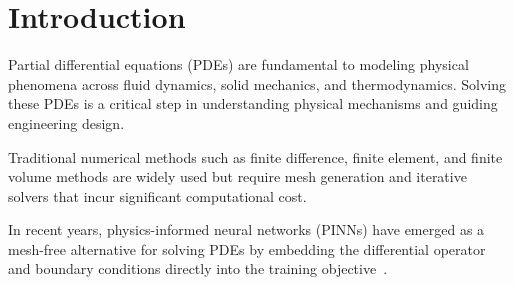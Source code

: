 \section{Introduction}

Partial differential equations (PDEs)
are fundamental to modeling physical phenomena across fluid dynamics,
solid mechanics, and thermodynamics.
Solving these PDEs is a critical step in understanding physical mechanisms and
guiding engineering design.

Traditional numerical methods such as finite difference, finite element,
and finite volume methods are widely used but require mesh generation and
iterative solvers that incur significant computational cost.

In recent years, physics-informed neural networks (PINNs)
have emerged as a mesh-free alternative for solving PDEs by embedding the
differential operator and boundary conditions directly into the
training objective~\cite{raissi2019pinn}.
